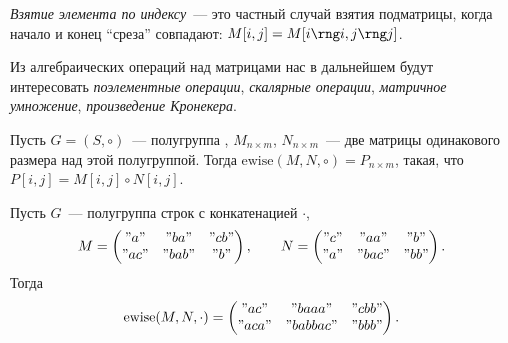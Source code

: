 \begin{definition}
    \emph{Взятие элемента по индексу}~--- это частный случай взятия подматрицы, когда начало и конец \enquote{среза} совпадают: $M[i, j] = M[i \rng i, j \rng j]$.
\end{definition}

Из алгебраических операций над матрицами нас в дальнейшем будут интересовать \emph{поэлементные операции}, \emph{скалярные операции}, \emph{матричное умножение}, \emph{произведение Кронекера}.

\begin{definition}
    Пусть $G = (S, \circ)$~--- полугруппа%
    , $M_{n \times m}$, $N_{n \times m}$~--- две матрицы одинакового размера над этой полугруппой.
    Тогда $\mathrm{ewise}(M, N, \circ) = P_{n \times m}$, такая, что $P[i, j] = M[i, j] \circ N[i, j]$.
\end{definition}

\begin{example}
    Пусть $G$~--- полугруппа строк с конкатенацией $\cdot$,
    \[M =
        \begin{pmatrix}
            "a"  & "ba"  & "cb" \\
            "ac" & "bab" & "b"
        \end{pmatrix},
        \qquad
        N =
        \begin{pmatrix}
            "c" & "aa"  & "b"  \\
            "a" & "bac" & "bb"
        \end{pmatrix}.
    \]
    Тогда
    \[
        \mathrm{ewise}(M, N, \cdot) =
        \begin{pmatrix}
            "ac"  & "baaa"   & "cbb" \\
            "aca" & "babbac" & "bbb"
        \end{pmatrix}.
    \]
\end{example}

